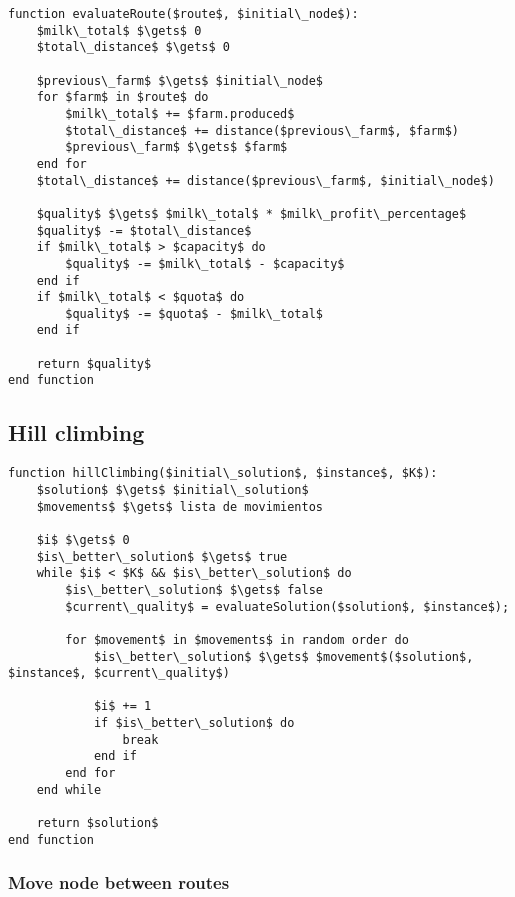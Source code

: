 \begin{lstlisting}[style=estiloPseudocodigo]
function evaluateRoute($route$, $initial\_node$):
    $milk\_total$ $\gets$ 0
    $total\_distance$ $\gets$ 0

    $previous\_farm$ $\gets$ $initial\_node$
    for $farm$ in $route$ do
        $milk\_total$ += $farm.produced$
        $total\_distance$ += distance($previous\_farm$, $farm$)
        $previous\_farm$ $\gets$ $farm$
    end for
    $total\_distance$ += distance($previous\_farm$, $initial\_node$)

    $quality$ $\gets$ $milk\_total$ * $milk\_profit\_percentage$
    $quality$ -= $total\_distance$
    if $milk\_total$ > $capacity$ do
        $quality$ -= $milk\_total$ - $capacity$
    end if
    if $milk\_total$ < $quota$ do
        $quality$ -= $quota$ - $milk\_total$
    end if

    return $quality$
end function
\end{lstlisting}

\subsection{Hill climbing}


\begin{lstlisting}[style=estiloPseudocodigo]
function hillClimbing($initial\_solution$, $instance$, $K$):
    $solution$ $\gets$ $initial\_solution$
    $movements$ $\gets$ lista de movimientos

    $i$ $\gets$ 0
    $is\_better\_solution$ $\gets$ true
    while $i$ < $K$ && $is\_better\_solution$ do
        $is\_better\_solution$ $\gets$ false
        $current\_quality$ = evaluateSolution($solution$, $instance$);

        for $movement$ in $movements$ in random order do
            $is\_better\_solution$ $\gets$ $movement$($solution$, $instance$, $current\_quality$)

            $i$ += 1
            if $is\_better\_solution$ do
                break
            end if
        end for
    end while

    return $solution$
end function
\end{lstlisting}


\subsubsection{Move node between routes}


